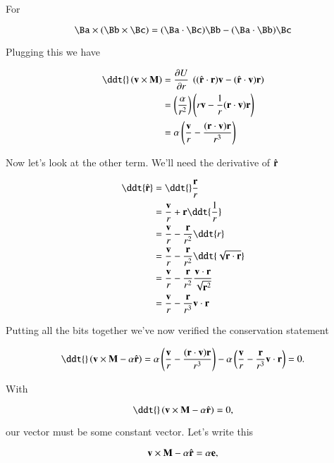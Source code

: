For

\begin{equation}\label{eqn:RungeLenz:130}
\Ba \cross (\Bb \cross \Bc) = (\Ba \cdot \Bc) \Bb -(\Ba \cdot \Bb) \Bc
\end{equation}

Plugging this we have

\begin{align*}
\ddt{} \left( \Bv \cross \BM \right)
&=
\PD{r}{U} \
\left( 
(\rcap \cdot \Br) \Bv
-(\rcap \cdot \Bv) \Br 
\right) \\
&=
\left( \frac{\alpha}{r^2} \right)
\left( 
r \Bv
-\inv{r}(\Br \cdot \Bv) \Br 
\right) \\
&=
\alpha
\left( 
\frac{\Bv}{r}
-\frac{(\Br \cdot \Bv) \Br }{r^3}
\right) \\
\end{align*}

Now let's look at the other term.  We'll need the derivative of $\hat{\mathbf{r}}$

\begin{align*}
\ddt{\rcap} 
&=
\ddt{} \frac{\Br}{r} \\
&=
\frac{\Bv}{r} + \Br \ddt{\inv{r}} \\
&=
\frac{\Bv}{r} - \frac{\Br}{r^2} \ddt{r} \\
&=
\frac{\Bv}{r} - \frac{\Br}{r^2} \ddt{ \sqrt{\Br \cdot \Br}} \\
&=
\frac{\Bv}{r} - \frac{\Br}{r^2} \frac{\Bv \cdot \Br}{\sqrt{\Br^2}} \\
&=
\frac{\Bv}{r} - \frac{\Br}{r^3} \Bv \cdot \Br
\end{align*}

Putting all the bits together we've now verified the conservation statement

\begin{equation}\label{eqn:RungeLenz:150}
\ddt{} \left(
\Bv \cross \BM - \alpha \rcap
\right)
=
\alpha
\left( 
\frac{\Bv}{r}
-\frac{(\Br \cdot \Bv) \Br }{r^3}
\right) 
-\alpha \left( 
\frac{\Bv}{r} - \frac{\Br}{r^3} \Bv \cdot \Br \right)
= 0.
\end{equation}

With 

\begin{equation}\label{eqn:RungeLenz:170}
\ddt{} \left( \Bv \cross \BM - \alpha \rcap \right) = 0,
\end{equation}

our vector must be some constant vector.  Let's write this

\begin{equation}\label{eqn:RungeLenz:190}
\mathbf{v} \times \mathbf{M} - \alpha \hat{\mathbf{r}} = \alpha \mathbf{e},
\end{equation}

